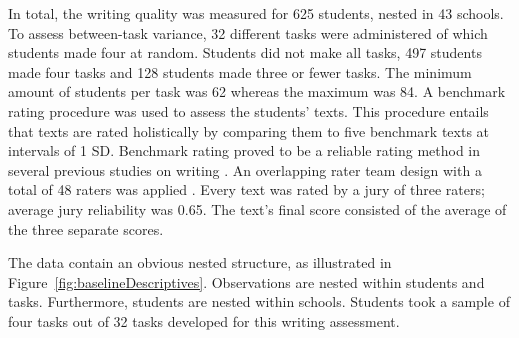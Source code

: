 \documentclass[a4paper]{article}
\newcommand{\DONa}	[1]		{\todo[inline, 	linecolor=gray, backgroundcolor=white]	{Don:	{#1}}}
\newcommand{\GR}	[1]		{\todo[			linecolor=gray, backgroundcolor=white]	{Gert: 	{#1}}}
\newcommand{\DONa}	[1]		{}
\newcommand{\GR}	[1] 	{}
\begin{document}
In total, the writing quality was measured for 625 students, nested in 43 schools. To assess between-task variance, 32 different tasks were administered of which students made four at random. Students did not make all tasks, 497 students made four tasks and 128 students made three or fewer tasks. The minimum amount of students per task was 62 whereas the maximum was 84. 
A benchmark rating procedure was used to assess the students' texts.
This procedure entails that texts are rated holistically by comparing them to five benchmark texts at intervals of 1 SD.
Benchmark rating proved to be a reliable rating method in several previous studies on writing \cite{blok1986essay, de2016student, rietdijk2017improving,bouwer2017tekster}.
An overlapping rater team design with a total of 48 raters was applied \cite{vandenbergh1989method}.
Every text was rated by a jury of three raters; average jury reliability was 0.65. The text's final score consisted of the average of the three separate scores.



The data contain an obvious nested structure, as illustrated in Figure~\ref{fig:baselineDescriptives}. Observations are nested within students and tasks. Furthermore, students are nested within schools. Students took a sample of four tasks out of 32 tasks developed for this writing assessment.
\end{document}

